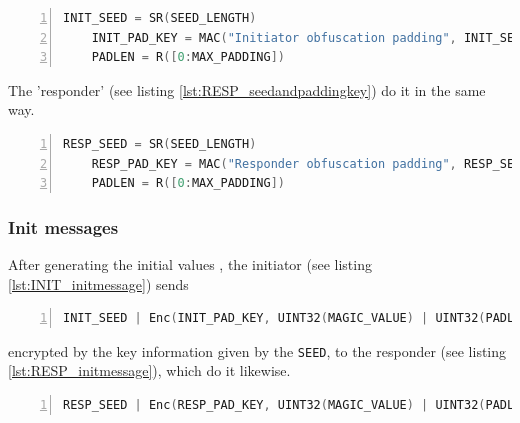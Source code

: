\documentclass[sigconf, screen]{acmart}
\begin{document}
\begin{lstlisting}[language=C,  tabsize=4, numbers=left, xleftmargin=5.0ex, basicstyle=\footnotesize, breakatwhitespace=false, breaklines=true, frame=tb, caption=Generate INIT seed and padding key \cite{TorGitWebObfs2Specification}., label=lst:INIT_seedandpaddingkey]
    INIT_SEED = SR(SEED_LENGTH)
    INIT_PAD_KEY = MAC("Initiator obfuscation padding", INIT_SEED)[:KEYLEN]
    PADLEN = R([0:MAX_PADDING])
\end{lstlisting}

The 'responder' (see listing \ref{lst:RESP_seedandpaddingkey}) do it in the same way.
\begin{lstlisting}[language=C,  tabsize=4, numbers=left, xleftmargin=5.0ex, basicstyle=\footnotesize, breakatwhitespace=false, breaklines=true, frame=tb, caption=Generate RESP seed and padding key \cite{TorGitWebObfs2Specification}., label=lst:RESP_seedandpaddingkey]
    RESP_SEED = SR(SEED_LENGTH)
    RESP_PAD_KEY = MAC("Responder obfuscation padding", RESP_SEED)[:KEYLEN]
    PADLEN = R([0:MAX_PADDING])
\end{lstlisting}
\subsubsection{Init messages}
\label{sss:initmessages}
After generating the initial values \cite{TorGitWebObfs2Specification}, the initiator (see listing \ref{lst:INIT_initmessage}) sends
\begin{lstlisting}[language=C,  tabsize=4, numbers=left, xleftmargin=5.0ex, basicstyle=\footnotesize, breakatwhitespace=false, breaklines=true, frame=tb, caption=INIT's init message \cite{TorGitWebObfs2Specification}., label=lst:INIT_initmessage]
    INIT_SEED | Enc(INIT_PAD_KEY, UINT32(MAGIC_VALUE) | UINT32(PADLEN) | WR(PADLEN))
\end{lstlisting}
encrypted by the key information given by the \lstinline[language=C]{SEED}, to the responder (see listing \ref{lst:RESP_initmessage}), which do it likewise.
\begin{lstlisting}[language=C,  tabsize=4, numbers=left, xleftmargin=5.0ex, basicstyle=\footnotesize, breakatwhitespace=false, breaklines=true, frame=tb, caption=RESP's init message \cite{TorGitWebObfs2Specification}., label=lst:RESP_initmessage]
    RESP_SEED | Enc(RESP_PAD_KEY, UINT32(MAGIC_VALUE) | UINT32(PADLEN) | WR(PADLEN))
\end{lstlisting}
\end{document}
